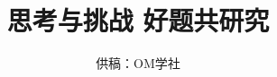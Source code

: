 \documentclass[UTF8, a4paper, 12pt, oneside, twocolumn]{article}
\title{思考与挑战 好题共研究}%
\author{供稿：OM学社}%
\date{}
\numberwithin{equation}{section}
\numberwithin{figure}{section}
\numberwithin{table}{section}
\def\dlim{\displaystyle\lim}
\def\D{\Delta}
\begin{document}
\newcommand\Om\Omega
\newcommand\OO{$\Om$}
\newcommand\F{\mathscr{F}}
\newcommand\FF{$\F$}
\newcommand\Pb[1][]{%
\ifthenelse{\equal{#1}{}}{\mathbb{P}}{\mathbb{P}\left(#1\right)}}
\newcommand\PP{$\Pb$}
\newcommand\bu[1]{#1^c}
\newcommand\limm[1]{\dlim_{#1\rightarrow \infty}}
\newcommand\Too[2][]{\xlongrightarrow[#1]{#2}}
\newcommand\To\rightarrow
\newcommand\sgm{$\sigma$-代数}
\newcommand\Bo[1][]{\ifthenelse{\equal{#1}{}}{\mathscr{B}}{\mathscr{B}^{#1}}}
\newcommand\Cb[2]{\binom{#1}{#2}}
\newcommand\yi[2][]{\ifthenelse{\equal{#1}{}}{\mathbbm{1}_{#2}}{\mathbbm{1}_{#2}\left(#1\right)}}
\renewcommand\exp[1]{\mathrm{e}^{#1}}
\newcommand\E[1]{\mathbb{E}\left(#1\right)}
\renewcommand\D[1]{\mathrm{D}\left(#1\right)}
\newcommand\limsupp[2][\infty]{\displaystyle\varlimsup_{#2\rightarrow#1}}
\newcommand\liminff[2][\infty]{\displaystyle\varliminf_{#2\rightarrow#1}}
\renewcommand\limsup{\varlimsup}
\newcommand\dliminf{\displaystyle\varliminf}
\newcommand\Pbb[2]{\Pb[#1|#2]}
\newcommand\as{\hspace{3pt plus 1pt minus 1pt}\mathrm{a.s.}}
\newcommand\dl{\perp}
\newcommand\iid{\hspace{3pt plus 1pt minus 1pt}\mathrm{i.i.d}}
\newcommand\Poi[1]{\mathcal{P}\left(#1\right)}
\newenvironment{myalign}%
{\vspace{-15pt}\vspace{-15pt}\begin{align*}}%
{\end{algin*}}
\maketitle
\thispagestyle{empty}
\end{document}

